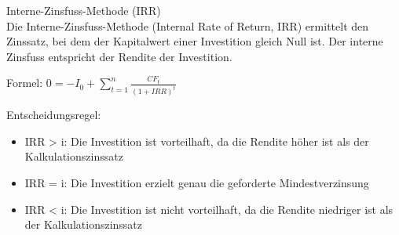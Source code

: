 \begin{definition}{Interne-Zinsfuss-Methode (IRR)}\\
Die Interne-Zinsfuss-Methode (Internal Rate of Return, IRR) ermittelt den Zinssatz, bei dem der Kapitalwert einer Investition gleich Null ist. Der interne Zinsfuss entspricht der Rendite der Investition.

Formel: $0 = -I_0 + \sum_{t=1}^{n} \frac{CF_t}{(1 + IRR)^t}$

Entscheidungsregel:
\begin{itemize}
    \item IRR > i: Die Investition ist vorteilhaft, da die Rendite höher ist als der Kalkulationszinssatz
    \item IRR = i: Die Investition erzielt genau die geforderte Mindestverzinsung
    \item IRR < i: Die Investition ist nicht vorteilhaft, da die Rendite niedriger ist als der Kalkulationszinssatz
\end{itemize}
\end{definition}

